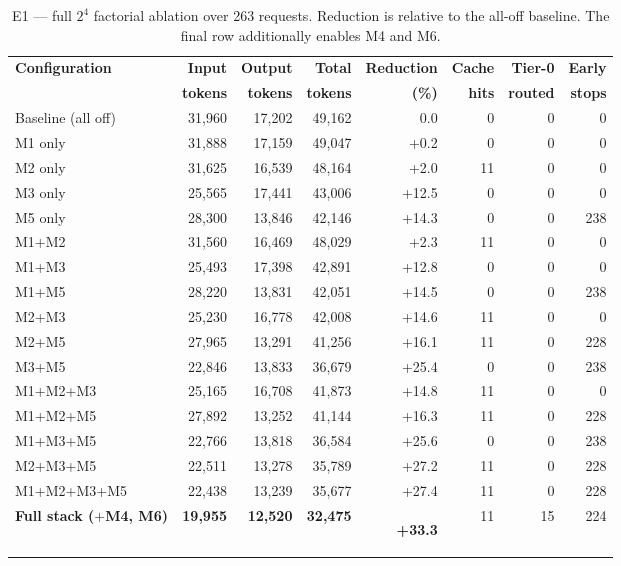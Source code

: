 \documentclass[11pt,a4paper]{article}
\newcommand{\hl}[1]{\colorbox{hlyellow}{\strut #1}}
\begin{document}
\begin{table}[htbp]
\centering
\caption{E1 --- full $2^4$ factorial ablation over 263 requests. Reduction is
relative to the all-off baseline. The final row additionally enables M4 and M6.}
\label{tab:ablation}
\footnotesize
\begin{tabular}{@{}l rrr r rrr@{}}
\toprule
\textbf{Configuration} & \textbf{Input} & \textbf{Output} & \textbf{Total} &
\textbf{Reduction} & \textbf{Cache} & \textbf{Tier-0} & \textbf{Early} \\
 & \textbf{tokens} & \textbf{tokens} & \textbf{tokens} & \textbf{(\%)} &
\textbf{hits} & \textbf{routed} & \textbf{stops} \\
\midrule
Baseline (all off) & 31{,}960 & 17{,}202 & 49{,}162 & \phantom{+}0.0 & 0 & 0 & 0 \\
\midrule
M1 only            & 31{,}888 & 17{,}159 & 49{,}047 & +0.2  & 0  & 0 & 0 \\
M2 only            & 31{,}625 & 16{,}539 & 48{,}164 & +2.0  & 11 & 0 & 0 \\
M3 only            & 25{,}565 & 17{,}441 & 43{,}006 & +12.5 & 0  & 0 & 0 \\
M5 only            & 28{,}300 & 13{,}846 & 42{,}146 & +14.3 & 0  & 0 & 238 \\
\midrule
M1+M2              & 31{,}560 & 16{,}469 & 48{,}029 & +2.3  & 11 & 0 & 0 \\
M1+M3              & 25{,}493 & 17{,}398 & 42{,}891 & +12.8 & 0  & 0 & 0 \\
M1+M5              & 28{,}220 & 13{,}831 & 42{,}051 & +14.5 & 0  & 0 & 238 \\
M2+M3              & 25{,}230 & 16{,}778 & 42{,}008 & +14.6 & 11 & 0 & 0 \\
M2+M5              & 27{,}965 & 13{,}291 & 41{,}256 & +16.1 & 11 & 0 & 228 \\
M3+M5              & 22{,}846 & 13{,}833 & 36{,}679 & +25.4 & 0  & 0 & 238 \\
\midrule
M1+M2+M3           & 25{,}165 & 16{,}708 & 41{,}873 & +14.8 & 11 & 0 & 0 \\
M1+M2+M5           & 27{,}892 & 13{,}252 & 41{,}144 & +16.3 & 11 & 0 & 228 \\
M1+M3+M5           & 22{,}766 & 13{,}818 & 36{,}584 & +25.6 & 0  & 0 & 238 \\
M2+M3+M5           & 22{,}511 & 13{,}278 & 35{,}789 & +27.2 & 11 & 0 & 228 \\
\midrule
M1+M2+M3+M5        & 22{,}438 & 13{,}239 & 35{,}677 & +27.4 & 11 & 0 & 228 \\
\textbf{Full stack ($+$M4, M6)} & \textbf{19{,}955} & \textbf{12{,}520} &
\textbf{32{,}475} & \hl{\textbf{+33.3}} & 11 & 15 & 224 \\
\bottomrule
\end{tabular}
\end{table}
\end{document}
